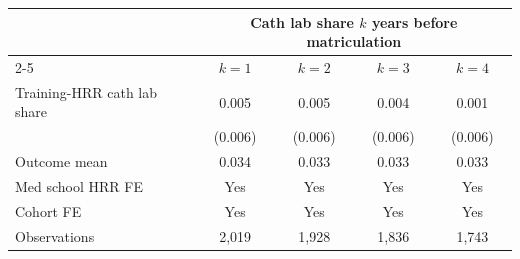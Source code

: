 \begin{tabular}{lcccc}
\toprule
 & \multicolumn{4}{c}{Cath lab share $k$ years before matriculation} \\
\cmidrule(lr){2-5}
 & $k=1$ & $k=2$ & $k=3$ & $k=4$ \\
\midrule
Training-HRR cath lab share & 0.005 & 0.005 & 0.004 & 0.001 \\
 & (0.006) & (0.006) & (0.006) & (0.006) \\
\midrule
Outcome mean & 0.034 & 0.033 & 0.033 & 0.033 \\
Med school HRR FE & Yes & Yes & Yes & Yes \\
Cohort FE & Yes & Yes & Yes & Yes \\
Observations & 2,019 & 1,928 & 1,836 & 1,743 \\
\bottomrule
\end{tabular}

